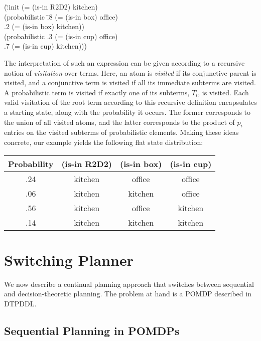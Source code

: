 \documentclass[letterpaper]{article}
\begin{document}
\small
\begin{tabtt}
(\=:init (= (is-in R2D2) kitchen) \+ \\
       (probabilistic \=.8 (= (is-in box) office)  \\
		      \>.2 (= (is-in box) kitchen)) \\
       (probabilistic .3 (= (is-in cup) office)  \\
		      \>.7 (= (is-in cup) kitchen))) \\
\end{tabtt}
\normalsize


\noindent The interpretation of such an expression can be given
according to a recursive notion of {\em visitation} over terms. Here,
an atom is {\em visited} if its conjunctive parent is visited, and a
conjunctive term is visited if all its immediate subterms are
visited. A probabilistic term is visited if exactly one of its
subterms, $T_i$, is visited. Each valid visitation of the root term
according to this recursive definition encapsulates a starting state,
along with the probability it occurs. The former corresponds to the
union of all visited atoms, and the latter corresponds to the product
of $p_i$ entries on the visited subterms of probabilistic
elements. Making these ideas concrete, our example yields the
following flat state distribution:


\small
\begin{tabular}{cccc}
\hline
Probability & (is-in R2D2)  & (is-in box)  & (is-in cup) \\
\hline
.24 & kitchen & office & office \\
.06 & kitchen & kitchen & office \\
.56 & kitchen & office & kitchen \\
.14 & kitchen & kitchen & kitchen \\
\hline
\end{tabular}
\normalsize

\section{Switching Planner}



We now describe a continual planning approach that switches between
sequential and decision-theoretic planning. The problem at hand is a
POMDP described in DTPDDL.  





\subsection{Sequential Planning in POMDPs}
\end{document}
